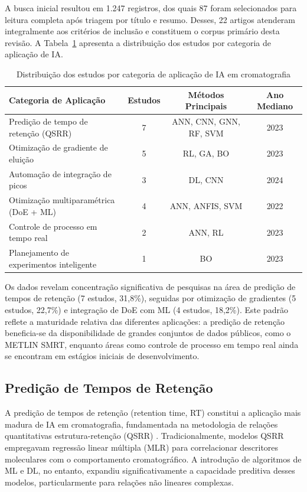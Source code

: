 \documentclass[preprint,12pt]{elsarticle}
\begin{document}
A busca inicial resultou em 1.247 registros, dos quais 87 foram selecionados para leitura completa após triagem por título e resumo. Desses, 22 artigos atenderam integralmente aos critérios de inclusão e constituem o corpus primário desta revisão. A Tabela~\ref{tab:categorias} apresenta a distribuição dos estudos por categoria de aplicação de IA.

\begin{table}[ht]
\caption{Distribuição dos estudos por categoria de aplicação de IA em cromatografia}
\label{tab:categorias}
\centering
\small
\begin{tabular}{p{5.5cm}ccc}
\toprule
Categoria de Aplicação & Estudos & Métodos Principais & Ano Mediano \\
\midrule
Predição de tempo de retenção (QSRR) & 7 & ANN, CNN, GNN, RF, SVM & 2023 \\
Otimização de gradiente de eluição & 5 & RL, GA, BO & 2023 \\
Automação de integração de picos & 3 & DL, CNN & 2024 \\
Otimização multiparamétrica (DoE + ML) & 4 & ANN, ANFIS, SVM & 2022 \\
Controle de processo em tempo real & 2 & ANN, RL & 2023 \\
Planejamento de experimentos inteligente & 1 & BO & 2023 \\
\bottomrule
\end{tabular}
\end{table}

Os dados revelam concentração significativa de pesquisas na área de predição de tempos de retenção (7 estudos, 31,8\%), seguidas por otimização de gradientes (5 estudos, 22,7\%) e integração de DoE com ML (4 estudos, 18,2\%). Este padrão reflete a maturidade relativa das diferentes aplicações: a predição de retenção beneficia-se da disponibilidade de grandes conjuntos de dados públicos, como o METLIN SMRT, enquanto áreas como controle de processo em tempo real ainda se encontram em estágios iniciais de desenvolvimento.

\subsection{Predição de Tempos de Retenção}

A predição de tempos de retenção (retention time, RT) constitui a aplicação mais madura de IA em cromatografia, fundamentada na metodologia de relações quantitativas estrutura-retenção (QSRR) \cite{singh2024, szucs2023}. Tradicionalmente, modelos QSRR empregavam regressão linear múltipla (MLR) para correlacionar descritores moleculares com o comportamento cromatográfico. A introdução de algoritmos de ML e DL, no entanto, expandiu significativamente a capacidade preditiva desses modelos, particularmente para relações não lineares complexas.
\end{document}
